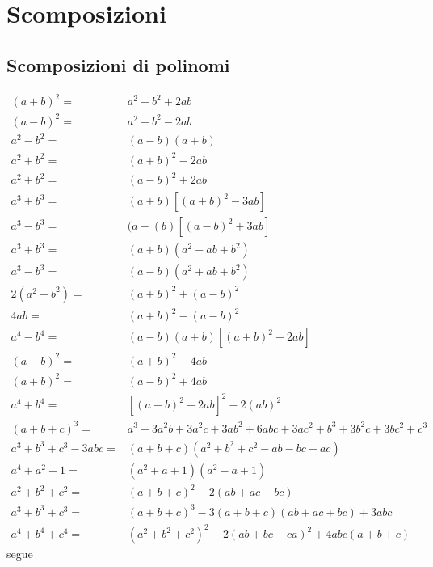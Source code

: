 \chapter{Scomposizioni}\label{ch:scomposizioni}
\section{Scomposizioni di polinomi}
\begin{thm}\label{thm:scomposizioni}
\begin{align}
(a+b)^2=&{}a^2+b^2+2ab\\
(a-b)^2=&{}a^2+b^2-2ab\\
a^2-b^2=&{}(a-b)(a+b)\\
a^2+b^2=&{}(a+b)^2-2ab\\
a^2+b^2=&{}(a-b)^2+2ab\\
a^3+b^3=&{}(a+b)[(a+b)^2-3ab]\label{eq:ascomp1}\\
a^3-b^3=&{}(a-(b)[(a-b)^2+3ab]\label{eq:ascomp2}\\
a^3+b^3=&{}(a+b)(a^2-ab+b^2)\label{eq:ascomp3}\\
a^3-b^3=&{}(a-b)(a^2+ab+b^2)\label{eq:ascomp4}\\
2(a^2+b^2)=&{}(a+b)^2+(a-b)^2\label{eq:ascomp5}\\
4ab=&{}(a+b)^2-(a-b)^2\label{eq:ascomp6}\\
a^4-b^4=&{}(a-b)(a+b)[(a+b)^2-2ab]\label{eq:ascomp7}\\
(a-b)^2=&{}(a+b)^2-4ab\label{eq:ascomp8}\\
(a+b)^2=&{}(a-b)^2+4ab\label{eq:ascomp9}\\
a^4+b^4=&{}[(a+b)^2-2ab]^2-2(ab)^2\label{eq:ascomp10}\\
(a+b+c)^3=&{}a^3 + 3a^2b + 3a^2c + 3ab^2 + 6abc + 3ac^2 + b^3 + 3b^2c + 3bc^2 + c^3\\
a^3+b^3+c^3-3abc=&{}(a+b+c)(a^2+b^2+c^2-ab-bc-ac)\label{eq:ascomp11}\\
a^4+a^2+1=&{}(a^2+a+1)(a^2-a+1)\label{eq:ascomp12}\\
a^2+b^2+c^2=&{}(a+b+c)^2-2(ab+ac+bc)\label{eq:ascomp13}\\
a^3+b^3+c^3=&{}(a+b+c)^3-3(a+b+c)(ab+ac+bc)+3abc\label{eq:ascomp14}\\
a^4+b^4+c^4=&{}(a^2+b^2+c^2)^2-2(ab+bc+ca)^2+4abc(a+b+c)\label{eq:ascomp15}
\end{align}
segue
\end{thm}
